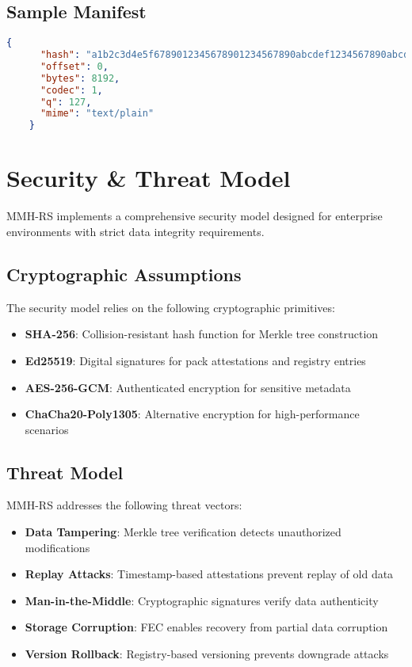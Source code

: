 \documentclass[11pt,a4paper]{article}
\begin{document}
	\subsection{Sample Manifest}
	
	\begin{lstlisting}[language=json, breaklines=true, basicstyle=\ttfamily\footnotesize, columns=fullflexible, keepspaces=true]
	{
	  "hash": "a1b2c3d4e5f6789012345678901234567890abcdef1234567890abcdef12345678",
	  "offset": 0,
	  "bytes": 8192,
	  "codec": 1,
	  "q": 127,
	  "mime": "text/plain"
	}
	\end{lstlisting}
	
	\section{Security \& Threat Model}
	
	MMH-RS implements a comprehensive security model designed for enterprise environments with strict data integrity requirements.
	
	\subsection{Cryptographic Assumptions}
	
	The security model relies on the following cryptographic primitives:
	\begin{itemize}
		\item \textbf{SHA-256}: Collision-resistant hash function for Merkle tree construction
		\item \textbf{Ed25519}: Digital signatures for pack attestations and registry entries
		\item \textbf{AES-256-GCM}: Authenticated encryption for sensitive metadata
		\item \textbf{ChaCha20-Poly1305}: Alternative encryption for high-performance scenarios
	\end{itemize}
	
	\subsection{Threat Model}
	
	MMH-RS addresses the following threat vectors:
	\begin{itemize}
		\item \textbf{Data Tampering}: Merkle tree verification detects unauthorized modifications
		\item \textbf{Replay Attacks}: Timestamp-based attestations prevent replay of old data
		\item \textbf{Man-in-the-Middle}: Cryptographic signatures verify data authenticity
		\item \textbf{Storage Corruption}: FEC enables recovery from partial data corruption
		\item \textbf{Version Rollback}: Registry-based versioning prevents downgrade attacks
	\end{itemize}
	
\end{document}
